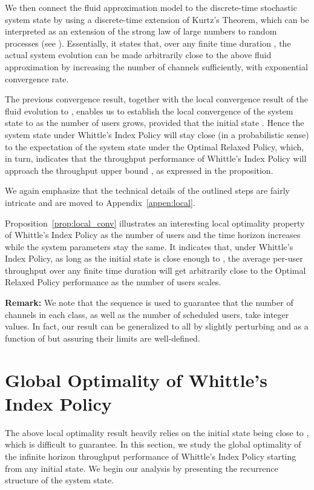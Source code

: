 \documentclass[11pt,twocolumn]{IEEEtran}
\begin{document}
 We then connect the fluid approximation model 
to the discrete-time stochastic system state  by using a discrete-time extension of
Kurtz's Theorem, which can be interpreted as an
extension of the strong law of large numbers to random processes
(see \cite{Weiss_LD}). Essentially, it states that, over any finite
time duration , the actual
system evolution  can be made arbitrarily close
to the above fluid approximation  by increasing the
number of channels  sufficiently, {with exponential convergence rate}.

 The previous convergence result, together with the local convergence
result of the fluid evolution  to , enables us to establish the local
convergence of the system state  to  as the number of users  grows,
provided that the initial state .
Hence the system state under Whittle's Index Policy will stay close
(in a probabilistic sense) to the expectation  of the system state under the Optimal
Relaxed Policy, which, in turn, indicates that the throughput
performance of Whittle's Index Policy will approach the throughput
upper bound , as expressed in the
proposition.

We again emphasize that the technical details of the outlined steps
are fairly intricate and are moved to Appendix~\ref{appen:local}.  \vspace{5pt}



Proposition~\ref{prop:local_conv} illustrates an interesting local
optimality property of Whittle's Index Policy as the number of users 
and the time horizon  increases while the system parameters
 stay the same. It indicates that, under
Whittle's Index Policy, as long as the initial state 
is close enough to , the average
per-user throughput over any finite time duration will get
arbitrarily close to the Optimal Relaxed Policy performance as the
number of users scales. \vspace{3pt}



\noindent \textbf{Remark: } We note that the sequence  is
used to guarantee that the number of channels in each class, as well
as the number of scheduled users, take integer values. In fact, our
result can be generalized to all  by slightly perturbing  and  as a function of  but assuring their limits
are well-defined.

\section{Global Optimality of Whittle's Index Policy}
\label{sec:global}
The above local optimality result heavily relies on the initial
state  being close to , which is difficult to guarantee. In this section, we study
the global optimality of the infinite horizon throughput performance
of Whittle's Index Policy starting from any initial state. We begin
our analysis by presenting the recurrence structure of the system state.
\end{document}
